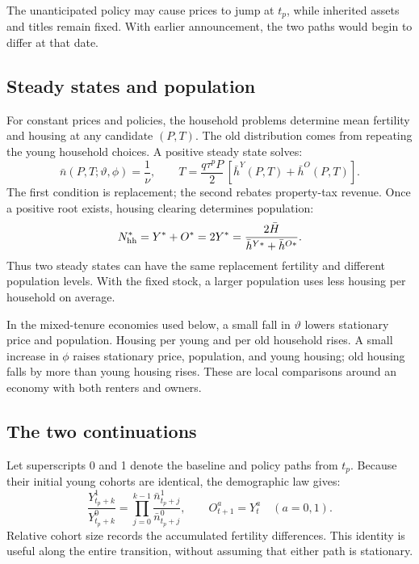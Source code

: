 \documentclass[11pt]{article}
\begin{document}
The unanticipated policy may cause prices to jump at $t_p$, while inherited
assets and titles remain fixed. With earlier announcement, the two paths
would begin to differ at that date.

\subsection{Steady states and population}
\label{sec:amend_population}

For constant prices and policies, the household problems determine mean
fertility and housing at any candidate $(P,T)$. The old distribution comes
from repeating the young household choices. A positive steady state solves:
\begin{equation}
 \bar n(P,T;\vartheta,\phi)=\frac1\nu,\qquad
 T=\frac{q\tau^pP}{2}\,[\bar h^Y(P,T)+\bar h^O(P,T)].
 \label{eq:amend_stationary_system}
\end{equation}
The first condition is replacement; the second rebates property-tax revenue.
Once a positive root exists, housing clearing determines population:
\begin{equation}
 N_{\rm hh}^*=Y^*+O^*=2Y^*
 =\frac{2\bar H}{\bar h^{Y*}+\bar h^{O*}}.
 \label{eq:amend_population_scale}
\end{equation}
Thus two steady states can have the same replacement fertility and different
population levels. With the fixed stock, a larger population uses less
housing per household on average.

In the mixed-tenure economies used below, a small fall in $\vartheta$
lowers stationary price and population. Housing per young and per old
household rises. A small increase in $\phi$ raises stationary price,
population, and young housing; old housing falls by more than young housing
rises. These are local comparisons around an economy with both renters and
owners.

\subsection{The two continuations}

Let superscripts 0 and 1 denote the baseline and policy paths from $t_p$.
Because their initial young cohorts are identical, the demographic law gives:
\begin{equation}
 \frac{Y_{t_p+k}^1}{Y_{t_p+k}^0}
 =\prod_{j=0}^{k-1}
       \frac{\bar n_{t_p+j}^1}{\bar n_{t_p+j}^0},\qquad
 O_{t+1}^a=Y_t^a\quad(a=0,1).
 \label{eq:amend_transition_population}
\end{equation}
Relative cohort size records the accumulated fertility differences.
This identity is useful along the entire transition, without assuming
that either path is stationary.
\end{document}
